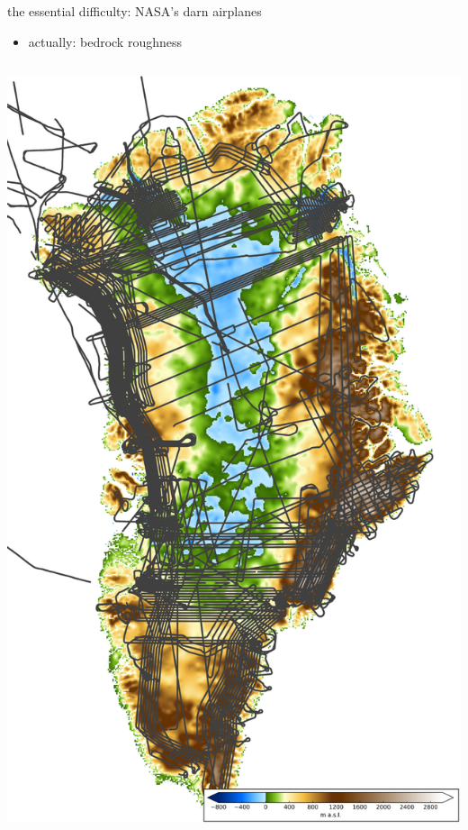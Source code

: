 \documentclass[xcolor={dvipsnames}]{beamer}
\begin{document}
\begin{frame}{the essential difficulty: NASA's darn airplanes}

\begin{itemize}
\item actually: \alert{bedrock roughness}
\end{itemize}

\begin{columns}
\begin{column}{0.5\textwidth}
\hspace{10mm} \includegraphics[height=0.7\textheight,keepaspectratio=true]{scale-greenland-bed-old-oib}


\end{column}
\end{columns}
\end{frame}
\end{document}
